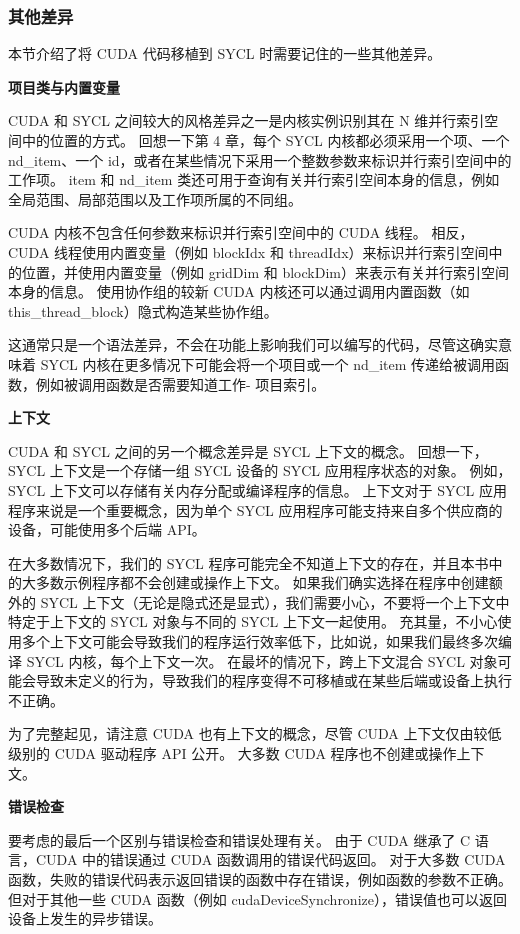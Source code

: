 \subsubsection{其他差异}
本节介绍了将 CUDA 代码移植到 SYCL 时需要记住的一些其他差异。

\textbf{项目类与内置变量}

CUDA 和 SYCL 之间较大的风格差异之一是内核实例识别其在 N 维并行索引空间中的位置的方式。 回想一下第 4 章，每个 SYCL 内核都必须采用一个项、一个 nd\_item、一个 id，或者在某些情况下采用一个整数参数来标识并行索引空间中的工作项。 item 和 nd\_item 类还可用于查询有关并行索引空间本身的信息，例如全局范围、局部范围以及工作项所属的不同组。

CUDA 内核不包含任何参数来标识并行索引空间中的 CUDA 线程。 相反，CUDA 线程使用内置变量（例如 blockIdx 和 threadIdx）来标识并行索引空间中的位置，并使用内置变量（例如 gridDim 和 blockDim）来表示有关并行索引空间本身的信息。 使用协作组的较新 CUDA 内核还可以通过调用内置函数（如 this\_thread\_block）隐式构造某些协作组。

这通常只是一个语法差异，不会在功能上影响我们可以编写的代码，尽管这确实意味着 SYCL 内核在更多情况下可能会将一个项目或一个 nd\_item 传递给被调用函数，例如被调用函数是否需要知道工作- 项目索引。

\textbf{上下文}

CUDA 和 SYCL 之间的另一个概念差异是 SYCL 上下文的概念。 回想一下，SYCL 上下文是一个存储一组 SYCL 设备的 SYCL 应用程序状态的对象。 例如，SYCL 上下文可以存储有关内存分配或编译程序的信息。 上下文对于 SYCL 应用程序来说是一个重要概念，因为单个 SYCL 应用程序可能支持来自多个供应商的设备，可能使用多个后端 API。

在大多数情况下，我们的 SYCL 程序可能完全不知道上下文的存在，并且本书中的大多数示例程序都不会创建或操作上下文。 如果我们确实选择在程序中创建额外的 SYCL 上下文（无论是隐式还是显式），我们需要小心，不要将一个上下文中特定于上下文的 SYCL 对象与不同的 SYCL 上下文一起使用。 充其量，不小心使用多个上下文可能会导致我们的程序运行效率低下，比如说，如果我们最终多次编译 SYCL 内核，每个上下文一次。 在最坏的情况下，跨上下文混合 SYCL 对象可能会导致未定义的行为，导致我们的程序变得不可移植或在某些后端或设备上执行不正确。

为了完整起见，请注意 CUDA 也有上下文的概念，尽管 CUDA 上下文仅由较低级别的 CUDA 驱动程序 API 公开。 大多数 CUDA 程序也不创建或操作上下文。

\textbf{错误检查}

要考虑的最后一个区别与错误检查和错误处理有关。 由于 CUDA 继承了 C 语言，CUDA 中的错误通过 CUDA 函数调用的错误代码返回。 对于大多数 CUDA 函数，失败的错误代码表示返回错误的函数中存在错误，例如函数的参数不正确。 但对于其他一些 CUDA 函数（例如 cudaDeviceSynchronize），错误值也可以返回设备上发生的异步错误。

